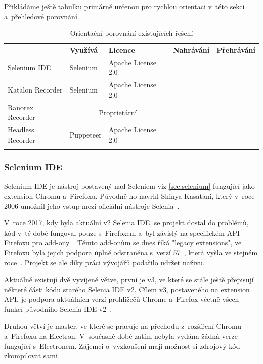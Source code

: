 \documentclass[12pt, a4paper, twoside]{article}
\newcommand{\cmark}{\ding{51}}
\newcommand{\xmark}{\ding{55}}
\begin{document}
	Přikládáme ještě tabulku primárně určenou pro rychlou orientaci v~této sekci a~přehledové porovnání.
{
	\begin{longtable}{ l|l|l|c|c } 
		\rowcolor{tableHeadingBackground} \multicolumn{1}{l}{\textbf{Název}} & \multicolumn{1}{l}{\textbf{Využívá}} & \multicolumn{1}{l}{\textbf{Licence}} & \multicolumn{1}{l}{\textbf{Nahrávání}} & \multicolumn{1}{l}{\textbf{Přehrávání}} \\
		Selenium IDE & Selenium & Apache License 2.0 & \cmark & \cmark \\
		Katalon Recorder & Selenium & Apache License 2.0 & \cmark & \cmark \\
		Ranorex Recorder & \multicolumn{2}{c}{Proprietární} & \cmark & \cmark \\
		Headless Recorder & Puppeteer & Apache License 2.0 & \cmark & \xmark \\
		\caption{Orientační porovnání existujících řešení}
	\end{longtable}
}
	\subsubsection{Selenium IDE}
	Selenium IDE je nástroj postavený nad Seleniem viz \ref{sec:selenium} fungující jako extension Chromu a~Firefoxu. Původně ho navrhl Shinya Kasatani, který v~roce 2006 umožnil jeho vstup mezi oficiální nástroje Selenia~\cite{seleniumHistory, seleniumIdeGithub}.
	
	V~roce 2017, kdy byla aktuální v2 Selenia IDE, se projekt dostal do problémů, kód v~té době fungoval pouze s~Firefoxem a~byl závislý na specifickém API Firefoxu pro add-ony~\cite{seleniumWhyUse}. Těmto add-onům se dnes říká "legacy extensions", ve Firefoxu byla jejich podpora úplně odstraněna s~verzí 57~\cite{firefoxLegacyExtensions}, která vyšla ve stejném roce~\cite{firefoxReleaseCalendar}. Projekt se ale díky práci vývojářů podařilo udržet naživu.
	
	\newpage
	Aktuálně existují dvě vyvíjené větve, první je v3, ve které se stále ještě přepisují některé části kódu starého Selenia IDE v2. Cílem v3, postaveného na extension API, je podpora aktuálních verzí prohlížečů Chrome a~Firefox včetně všech funkcí původního Selenia IDE v2~\cite{seleniumIdeGithub}.
	
	Druhou větví je master, ve které se pracuje na přechodu z~rozšíření Chromu a~Firefoxu na Electron. V~současné době zatím nebyla vydána žádná verze fungující s~Electronem. Zájemci o~vyzkoušení mají možnost si zdrojový kód zkompilovat sami~\cite{seleniumIdeGithub}.
	
\end{document}
